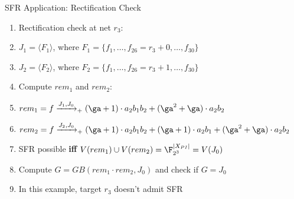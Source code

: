 \begin{frame}{\large SFR Application: Rectification Check}
	\vspace{0.1in}
	\begin{enumerate}
		\item Rectification check at net $r_3$: %
		\bi
			\item $J_1 = \langle F_1\rangle$, where $F_1=\{f_1,\dots, f_{26}=r_3+0,\dots, f_{30}\}$
			\item $J_2 = \langle F_2\rangle$, where $F_2 = \{f_1,\dots, f_{26}=r_3+1,\dots, f_{30}\}$
		\ei
		\vspace{0.1in}
		\pause
		\item Compute $rem_1$ and $rem_2$:
		\bi
			\item $rem_1 = f \xrightarrow[]{J_1, J_0}_+{(\ga+1)\cdot a_2b_1b_2+(\ga^2+\ga)\cdot a_2b_2}$
			\item $rem_2 = f \xrightarrow[]{J_2,J_0}_+{(\ga+1)\cdot a_2b_1b_2+(\ga+1)\cdot a_2b_1+(\ga^2+\ga)\cdot a_2b_2}$
		\ei
		\vspace{0.1in}
		\pause
		\item SFR possible {\bf iff} $V(rem_1) \cup V(rem_2) = \F_{2^3}^{|X_{PI}|} = V(J_0)$
		\bi
		\pause
			\vspace{0.1in}
			\item Compute $G = GB(rem_1\cdot rem_2, J_0)$ and check if $G=J_0$
			\vspace{0.1in}
			\item In this example, target $r_3$ doesn't admit SFR
		\ei
	\end{enumerate}
\end{frame}


